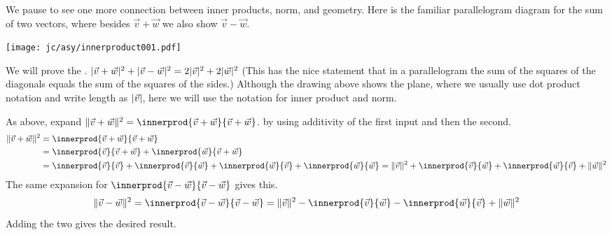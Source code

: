 We pause to see one more connection between inner products, norm, and geometry.
Here is the familiar parallelogram diagram for the sum of two vectors,
where besides $\vec{v}+\vec{w}$ we also show $\vec{v}-\vec{w}$. 
\begin{center}
  \texttt{[image: jc/asy/innerproduct001.pdf]}
\end{center}
We will prove the 
.
$\lvert\vec{v}+\vec{w}\rvert^2+\lvert\vec{v}-\vec{w}\rvert^2=2\lvert\vec{v}\rvert^2+2\lvert\vec{w}\rvert^2$
(This has the nice statement that in a parallelogram the sum of the squares 
of the diagonals equals the sum of the squares of the sides.)
Although the drawing above shows the plane, where we usually use dot product 
notation and write length as $\lvert\vec{v}\rvert$, 
here we will use the notation for inner product and norm.

As above, expand
$
  \norm{\vec{v}+\vec{w}}^2=\innerprod{\vec{v}+\vec{w}}{\vec{v}+\vec{w}}
$.
by using additivity of the first input and then the second. 
\begin{align*}
  \norm{\vec{v}+\vec{w}}^2
  &=\innerprod{\vec{v}+\vec{w}}{\vec{v}+\vec{w}}           \\
  &=\innerprod{\vec{v}}{\vec{v}+\vec{w}}+\innerprod{\vec{w}}{\vec{v}+\vec{w}} \\
  &=\innerprod{\vec{v}}{\vec{v}}            
   +\innerprod{\vec{v}}{\vec{w}}
   +\innerprod{\vec{w}}{\vec{v}}
   +\innerprod{\vec{w}}{\vec{w}}
  =\norm{\vec{v}}^2            
   +\innerprod{\vec{v}}{\vec{w}}
   +\innerprod{\vec{w}}{\vec{v}}
   +\norm{\vec{w}}^2
\end{align*}
The same expansion for $\innerprod{\vec{v}-\vec{w}}{\vec{v}-\vec{w}}$
gives this.
\begin{equation*}
  \norm{\vec{v}-\vec{w}}^2
  =\innerprod{\vec{v}-\vec{w}}{\vec{v}-\vec{w}}
  =\norm{\vec{v}}^2
   -\innerprod{\vec{v}}{\vec{w}}
   -\innerprod{\vec{w}}{\vec{v}}
   +\norm{\vec{w}}^2
\end{equation*}
Adding the two gives the desired result. 

